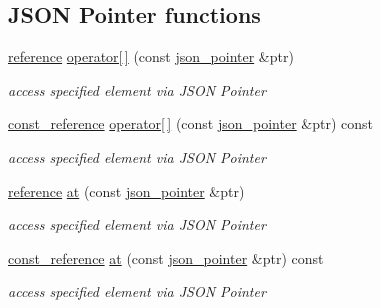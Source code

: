 \subsection*{J\+S\+ON Pointer functions}
\begin{DoxyCompactItemize}
\item 
\mbox{\hyperlink{classnlohmann_1_1basic__json_ac6a5eddd156c776ac75ff54cfe54a5bc}{reference}} \mbox{\hyperlink{classnlohmann_1_1basic__json_ac6946dffeb3be5aa173645f0467a44b3}{operator\mbox{[}$\,$\mbox{]}}} (const \mbox{\hyperlink{classnlohmann_1_1basic__json_a6886a5001f5b449ad316101a311ce536}{json\+\_\+pointer}} \&ptr)
\begin{DoxyCompactList}\small\item\em access specified element via J\+S\+ON Pointer \end{DoxyCompactList}\item 
\mbox{\hyperlink{classnlohmann_1_1basic__json_a4057c5425f4faacfe39a8046871786ca}{const\+\_\+reference}} \mbox{\hyperlink{classnlohmann_1_1basic__json_a9d55e3e63b05e03a2b70cea3761f84cb}{operator\mbox{[}$\,$\mbox{]}}} (const \mbox{\hyperlink{classnlohmann_1_1basic__json_a6886a5001f5b449ad316101a311ce536}{json\+\_\+pointer}} \&ptr) const
\begin{DoxyCompactList}\small\item\em access specified element via J\+S\+ON Pointer \end{DoxyCompactList}\item 
\mbox{\hyperlink{classnlohmann_1_1basic__json_ac6a5eddd156c776ac75ff54cfe54a5bc}{reference}} \mbox{\hyperlink{classnlohmann_1_1basic__json_a8ab61397c10f18b305520da7073b2b45}{at}} (const \mbox{\hyperlink{classnlohmann_1_1basic__json_a6886a5001f5b449ad316101a311ce536}{json\+\_\+pointer}} \&ptr)
\begin{DoxyCompactList}\small\item\em access specified element via J\+S\+ON Pointer \end{DoxyCompactList}\item 
\mbox{\hyperlink{classnlohmann_1_1basic__json_a4057c5425f4faacfe39a8046871786ca}{const\+\_\+reference}} \mbox{\hyperlink{classnlohmann_1_1basic__json_a7479d686148c26e252781bb32aa5d5c9}{at}} (const \mbox{\hyperlink{classnlohmann_1_1basic__json_a6886a5001f5b449ad316101a311ce536}{json\+\_\+pointer}} \&ptr) const
\begin{DoxyCompactList}\small\item\em access specified element via J\+S\+ON Pointer \end{DoxyCompactList}\item 

\end{DoxyCompactItemize}
